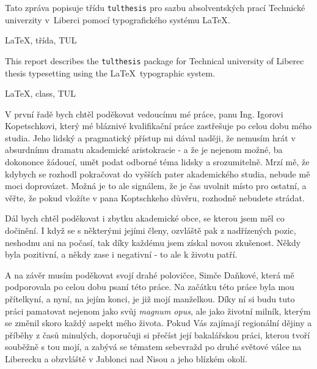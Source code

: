 \documentclass[FM,DP,fonts]{tulthesis}
\begin{document}

\begin{abstractCZ}
	Tato zpráva popisuje třídu \texttt{tulthesis} pro sazbu absolventských prací
	Technické univerzity v~Liberci pomocí typografického systému \LaTeX.
\end{abstractCZ}

\begin{keywordsCZ}
	\LaTeX, třída, TUL
\end{keywordsCZ}

\vspace{2cm}

\begin{abstractEN}
	This report describes the \texttt{tulthesis} package for Technical university of
	Liberec thesis typesetting using the \LaTeX\ typographic system.
\end{abstractEN}

\begin{keywordsEN}
	\LaTeX, class, TUL
\end{keywordsEN}

\clearpage

\begin{acknowledgement}
	V první řadě bych chtěl poděkovat vedoucímu mé práce, panu Ing. Igorovi Kopetschkovi, který mé bláznivé kvalifikační práce zastřešuje po celou dobu mého studia. Jeho lidský a pragmatický přístup mi dával naději, že nemusím hrát v absurdnímu dramatu akademické aristokracie - a že je nejenom možné, ba dokononce žádoucí, umět podat odborné téma lidsky a srozumitelně. Mrzí mě, že kdybych se rozhodl pokračovat do vyšších pater akademického studia, nebude mě moci doprovázet. Možná je to ale signálem, že je čas uvolnit místo pro ostatní, a věřte, že pokud vložíte v pana Koptschkeho důvěru, rozhodně nebudete strádat.

	Dál bych chtěl poděkovat i zbytku akademické obce, se kterou jsem měl co dočinění. I když se s některými jejími členy, ozvláště pak z nadřízených pozic, neshodnu ani na počasí, tak díky každému jsem získal novou zkušenost. Někdy byla pozitivní, a někdy zase i negativní - to ale k životu patří.

	A na závěr musím poděkovat svojí drahé polovičce, Simče Daňkové, která mě podporovala po celou dobu psaní této práce. Na začátku této práce byla mou přítelkyní, a nyní, na jejím konci, je již mojí manželkou. Díky ní si budu tuto práci pamatovat nejenom jako svůj \textit{magnum opus}, ale jako životní milník, kterým se změnil skoro každý aspekt mého života. Pokud Vás zajímají regionální dějiny a příběhy z časů minulých, doporučuji si přečíst její bakalářskou práci, kterou tvoří souběžně s tou mojí, a zabývá se tématem sebevražd po druhé světové válce na Liberecku a obzvláště v Jablonci nad Nisou a jeho blízkém okolí.

\end{acknowledgement}
\end{document}
